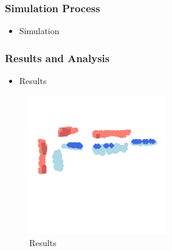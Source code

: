 \documentclass{beamer}
\begin{document}
\begin{frame}
  \frametitle{Simulation Process}
  \begin{itemize}
  \item{Simulation}
  \end{itemize}
\end{frame}

\begin{frame}
  \frametitle{Results and Analysis}
  \begin{itemize}
  \item{Results}
  \end{itemize}
  \begin{figure}
    \centering
    \includegraphics[width=6cm]{Battle_1.png}
    \caption{Results}
    \label{fig:Simulation}
    \centering
  \end{figure}

  
\end{frame}

\end{document}
